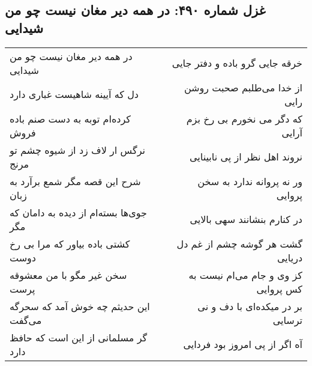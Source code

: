 \begin{center}
\section*{غزل شماره ۴۹۰: در همه دیر مغان نیست چو من شیدایی}
\label{sec:sh490}
\begin{longtable}{l p{0.5cm} r}
در همه دیر مغان نیست چو من شیدایی
&&
خرقه جایی گرو باده و دفتر جایی
\\
دل که آیینه شاهیست غباری دارد
&&
از خدا می‌طلبم صحبت روشن رایی
\\
کرده‌ام توبه به دست صنم باده فروش
&&
که دگر می نخورم بی رخ بزم آرایی
\\
نرگس ار لاف زد از شیوه چشم تو مرنج
&&
نروند اهل نظر از پی نابینایی
\\
شرح این قصه مگر شمع برآرد به زبان
&&
ور نه پروانه ندارد به سخن پروایی
\\
جوی‌ها بسته‌ام از دیده به دامان که مگر
&&
در کنارم بنشانند سهی بالایی
\\
کشتی باده بیاور که مرا بی رخ دوست
&&
گشت هر گوشه چشم از غم دل دریایی
\\
سخن غیر مگو با من معشوقه پرست
&&
کز وی و جام می‌ام نیست به کس پروایی
\\
این حدیثم چه خوش آمد که سحرگه می‌گفت
&&
بر در میکده‌ای با دف و نی ترسایی
\\
گر مسلمانی از این است که حافظ دارد
&&
آه اگر از پی امروز بود فردایی
\\
\end{longtable}
\end{center}

